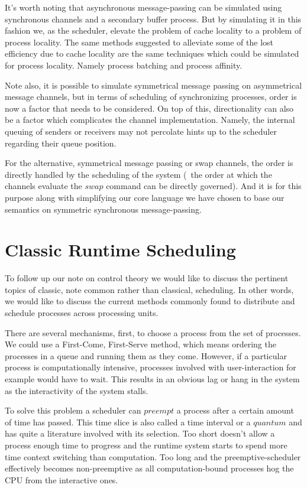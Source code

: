 It's worth noting that asynchronous message-passing can be simulated using 
synchronous channels and a secondary buffer process. But by simulating it in 
this fashion we, as the scheduler, elevate the problem of cache locality to a
problem of process locality. The same methods suggested to alleviate some of the 
lost efficiency due to cache locality \cite{markatos1991load,markatos1991memory}
are the same techniques which could be simulated for process locality. Namely
process batching and process affinity.

Note also, it is possible to simulate symmetrical message passing on asymmetrical 
message channels, but in terms of scheduling of synchronizing processes, order 
is now a factor that needs to be considered. On top of this, directionality can 
also be a factor which complicates the channel implementation. Namely, the 
internal queuing of senders or receivers may not percolate hints up to the 
scheduler regarding their queue position. 

For the alternative, symmetrical message passing or swap channels, the order is 
directly handled by the scheduling of the system (\ie~the order at which the 
channels evaluate the $swap$ command can be directly governed). And it is for 
this purpose along with simplifying our core language we have chosen to base our
semantics on symmetric synchronous message-passing. 

\section{Classic Runtime Scheduling}

To follow up our note on control theory we would like to discuss the pertinent 
topics of classic, note common rather than classical, scheduling. In other words,
we would like to discuss the current methods commonly found to distribute and 
schedule processes across processing units.

There are several mechanisms, first, to choose a process from the set of 
processes. We could use a First-Come, First-Serve method, which means ordering 
the processes in a queue and running them as they come. However, if a particular
process is computationally intensive, processes involved with user-interaction 
for example would have to wait. This results in an obvious lag or hang in the 
system as the interactivity of the system stalls. 

To solve this problem a scheduler can $preempt$ a process after a certain amount
of time has passed. This time slice is also called a time interval or a $quantum$
and has quite a literature involved with its selection. 
Too short doesn't allow a process enough time to progress and the runtime system
starts to spend more time context switching than computation. Too long and the
preemptive-scheduler effectively becomes non-preemptive as all computation-bound
processes hog the CPU from the interactive ones.

